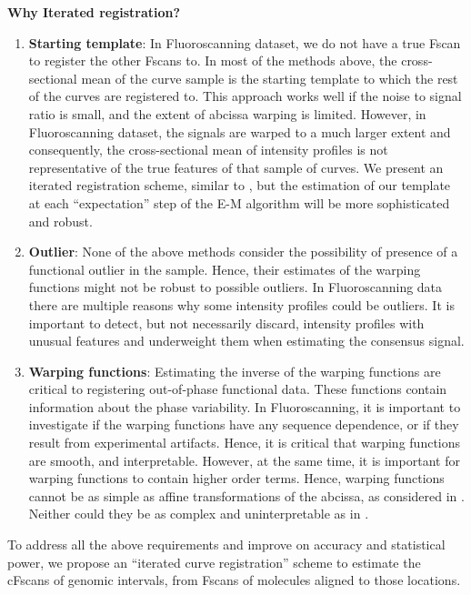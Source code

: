 \noindent
{\bf{Why Iterated registration?}}
\begin{enumerate}
\item {\bf{Starting template}}: In Fluoroscanning dataset, we do not have a true Fscan to register the other Fscans to. In most of the methods above, the cross-sectional mean of the curve sample is the starting template to which the rest of the curves are registered to. This approach works well if the noise to signal ratio is small, and the extent of abcissa warping is limited. However, in Fluoroscanning dataset, the signals are warped to a much larger extent and consequently, the cross-sectional mean of intensity profiles is not representative of the true features of that sample of curves. We present an iterated registration scheme, similar to \cite{Sangalli_etal_2009_JASA}, but the estimation of our template at each ``expectation'' step of the E-M algorithm will be more sophisticated and robust. 
\item {\bf{Outlier}}: None of the above methods consider the possibility of presence of a functional outlier in the sample. Hence, their estimates of the warping functions might not be robust to possible outliers. In Fluoroscanning data there are multiple reasons why some intensity profiles could be outliers. It is important to detect, but not necessarily discard, intensity profiles with unusual features and underweight them when estimating the consensus signal. 
\item {\bf{Warping functions}}: Estimating the inverse of the warping functions are critical to registering out-of-phase functional data. These functions contain information about the phase variability. In Fluoroscanning, it is important to investigate if the warping functions have any sequence dependence, or if they result from experimental artifacts. Hence, it is critical that warping functions are smooth, and interpretable. However, at the same time, it is important for warping functions to contain higher order terms. Hence, warping functions cannot be as simple as affine transformations of the abcissa, as considered in \cite{Sangalli_etal_2009_JASA}. Neither could they be as complex and uninterpretable as in \cite{Srivastava_etal_2011_v2_arXiv}. 
\end{enumerate}
To address all the above requirements and improve on accuracy and statistical power, we propose an ``iterated curve registration'' scheme to estimate the cFscans of genomic intervals, from Fscans of molecules aligned to those locations. \\

